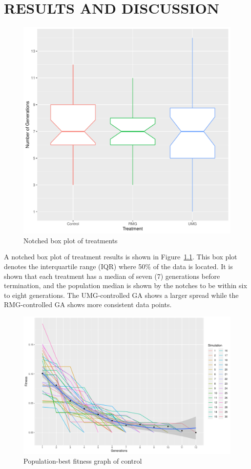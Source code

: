 \documentclass{strrespaper-trad}
\begin{document}
	\chapter{RESULTS AND DISCUSSION}
		\begin{figure}[htbp]
			\centering
			\includegraphics[width=\linewidth]{../figures/boxplot}
			\caption{Notched box plot of treatments}
			\label{fig:boxplot}
		\end{figure}

		A notched box plot of treatment results is shown in Figure~\ref{fig:boxplot}.
		This box plot denotes the interquartile range (IQR) where 50\% of the data is located.
		It is shown that each treatment has a median of seven (7) generations before termination, and the population median is shown by the notches to be within six to eight generations.
		The UMG-controlled GA shows a larger spread while the RMG-controlled GA shows more consistent data points.

		\begin{figure}[htbp]
			\centering
			\includegraphics[width=\linewidth]{../figures/ctrl_ftrack}
			\caption{Population-best fitness graph of control}
			\label{fig:fitgraph_ctrl}
		\end{figure}
\end{document}

